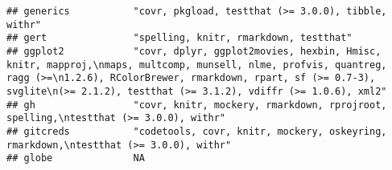 \documentclass[
]{article}
\begin{document}
\begin{verbatim}
## generics           "covr, pkgload, testthat (>= 3.0.0), tibble, withr"                                                                                                                                                                                                                                                                                                                                                                                                                               
## gert               "spelling, knitr, rmarkdown, testthat"                                                                                                                                                                                                                                                                                                                                                                                                                                            
## ggplot2            "covr, dplyr, ggplot2movies, hexbin, Hmisc, knitr, mapproj,\nmaps, multcomp, munsell, nlme, profvis, quantreg, ragg (>=\n1.2.6), RColorBrewer, rmarkdown, rpart, sf (>= 0.7-3), svglite\n(>= 2.1.2), testthat (>= 3.1.2), vdiffr (>= 1.0.6), xml2"                                                                                                                                                                                                                                
## gh                 "covr, knitr, mockery, rmarkdown, rprojroot, spelling,\ntestthat (>= 3.0.0), withr"                                                                                                                                                                                                                                                                                                                                                                                               
## gitcreds           "codetools, covr, knitr, mockery, oskeyring, rmarkdown,\ntestthat (>= 3.0.0), withr"                                                                                                                                                                                                                                                                                                                                                                                              
## globe              NA                                                                                                                                                                                                                                                                                                                                                                                                                                                                                

\end{verbatim}
\end{document}
